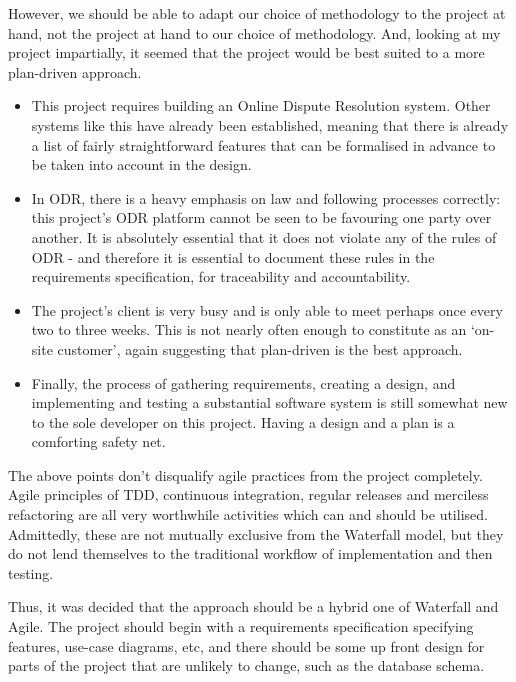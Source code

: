 However, we should be able to adapt our choice of methodology to the project at hand, not the project at hand to our choice of methodology. And, looking at my project impartially, it seemed that the project would be best suited to a more plan-driven approach.

\begin{itemize}

    \item This project requires building an Online Dispute Resolution system. Other systems like this have already been established, meaning that there is already a list of fairly straightforward features that can be formalised in advance to be taken into account in the design.
    
    \item In ODR, there is a heavy emphasis on law and following processes correctly: this project's ODR platform cannot be seen to be favouring one party over another. It is absolutely essential that it does not violate any of the rules of ODR - and therefore it is essential to document these rules in the requirements specification, for traceability and accountability.
    
    \item The project's client is very busy and is only able to meet perhaps once every two to three weeks. This is not nearly often enough to constitute as an `on-site customer', again suggesting that plan-driven is the best approach.
    
    \item Finally, the process of gathering requirements, creating a design, and implementing and testing a substantial software system is still somewhat new to the sole developer on this project. Having a design and a plan is a comforting safety net.

\end{itemize}

The above points don't disqualify agile practices from the project completely. Agile principles of TDD, continuous integration, regular releases and merciless refactoring are all very worthwhile activities which can and should be utilised. Admittedly, these are not mutually exclusive from the Waterfall model, but they do not lend themselves to the traditional workflow of implementation and then testing.

Thus, it was decided that the approach should be a hybrid one of Waterfall and Agile. The project should begin with a requirements specification specifying features, use-case diagrams, etc, and there should be some up front design for parts of the project that are unlikely to change, such as the database schema.

